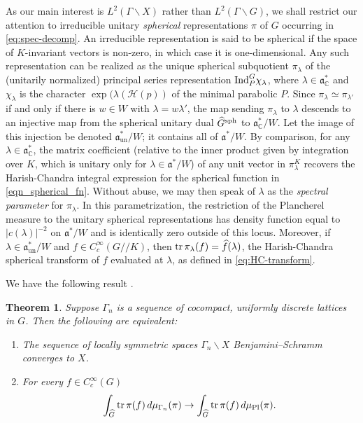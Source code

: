 \documentclass[12pt]{amsart}
\newtheorem{theorem}{Theorem}[section]
\theoremstyle{remark}
\newcommand{\C}{\mathbb C}
\newcommand{\ga}{\mathfrak a}
\begin{document}
As our main interest is $L^2(\Gamma\backslash X)$ rather than $L^2(\Gamma\backslash G)$, we shall restrict our attention to irreducible unitary \textit{spherical} representations $\pi$ of $G$ occurring in \eqref{eq:spec-decomp}. An irreducible representation is said to be spherical if the space of $K$-invariant vectors is non-zero, in which case it is one-dimensional. Any such representation can be realized as the unique spherical subquotient $\pi_\lambda$ of the (unitarily normalized) principal series representation ${\rm Ind}_P^G\chi_\lambda$, where $\lambda\in\ga_\C^*$ and $\chi_\lambda$ is the character $\exp(\lambda(\mathcal{H}(p))$ of the minimal parabolic $P$. Since $\pi_\lambda\simeq \pi_{\lambda'}$ if and only if there is $w\in W$ with $\lambda=w\lambda'$, the map sending $\pi_\lambda$ to $\lambda$ descends to an injective map from the spherical unitary dual  $\widehat{G}^{\rm sph}$ to $\ga_\C^*/W$. Let the image of this injection be denoted $\ga^*_{\text{un}}/W$; it contains all of $\ga^*/W$. By comparison, for any $\lambda\in\ga^*_\C$, the matrix coefficient (relative to the inner product given by integration over $K$, which is unitary only for $\lambda\in\ga^*/W$) of any unit vector in $\pi_\lambda^K$ recovers the Harish-Chandra integral expression for the spherical function in \eqref{eqn_spherical_fn}. Without abuse, we may then speak of $\lambda$ as the \textit{spectral parameter} for $\pi_\lambda$. In this parametrization, the restriction of the Plancherel measure to the unitary spherical representations has density function equal to $|c(\lambda)|^{-2}$ on $\ga^*/W$ and is identically zero outside of this locus. Moreover, if $\lambda\in\ga^*_{\text{un}}/W$ and $f \in C_c^\infty(G /\!\!/ K)$, then $\textnormal{tr}\,\pi_\lambda(f)=\widehat{f}(\lambda)$, the Harish-Chandra spherical transform of $f$ evaluated at $\lambda$, as defined in \eqref{eq:HC-transform}.


We have the following result \cite{Deitmar_18, 7_samurai}.
\begin{theorem} \label{thm_bs_plancherel_conv}
    Suppose $\Gamma_n$ is a sequence of cocompact, uniformly discrete lattices in $G$. Then the following are equivalent:
    \begin{enumerate}
        \item The sequence of locally symmetric spaces $\Gamma_n \backslash X$ Benjamini--Schramm converges to $X$.
        \item For every $f \in C_c^\infty(G)$
        \begin{gather}
            \int_{\widehat{G}} \textnormal{tr}\,\pi(f)\, d \mu_{\Gamma_n}(\pi) \to \int_{\widehat{G}} \textnormal{tr}\,\pi(f)\, d \mu_{\rm Pl}(\pi). \label{eqn_weak_conv}
        \end{gather}
    \end{enumerate}
\end{theorem}
\end{document}
